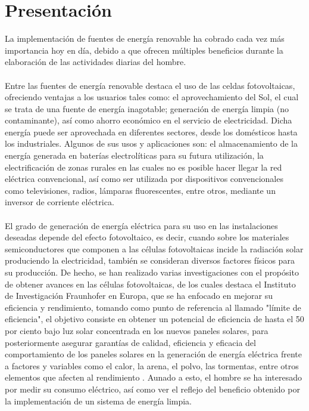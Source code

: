
\section{Presentación} %
La implementación de fuentes de energía renovable ha cobrado cada vez más importancia hoy en día, debido a que ofrecen múltiples beneficios durante la elaboración de las actividades diarias del hombre. 
\paragraph{}
Entre las fuentes de energía renovable destaca el uso de las celdas fotovoltaicas, ofreciendo ventajas a los usuarios tales como: el aprovechamiento del Sol, el cual se trata de una fuente de energía inagotable; generación de energía limpia (no contaminante), así como ahorro económico en el servicio de electricidad. Dicha energía puede ser aprovechada en diferentes sectores, desde los domésticos hasta los industriales. Algunos de sus usos y aplicaciones son: el almacenamiento de la energía generada en baterías electrolíticas para su futura utilización, la electrificación de zonas rurales en las cuales no es posible hacer llegar la red eléctrica convencional, así como ser utilizada por dispositivos convencionales como televisiones, radios, lámparas fluorescentes, entre otros, mediante un inversor de corriente eléctrica.\citep{Pre1}   
\paragraph{}
El grado de generación de energía eléctrica para su uso en las instalaciones deseadas depende del efecto fotovoltaico, es decir, cuando sobre los materiales semiconductores que componen a las células fotovoltaicas incide la radiación solar produciendo la electricidad, también se consideran diversos factores físicos para su producción. De hecho, se han realizado varias investigaciones con el propósito de obtener avances en las células fotovoltaicas, de los cuales destaca el Instituto de Investigación Fraunhofer en Europa, que se ha enfocado en mejorar su eficiencia y rendimiento, tomando como punto de referencia al llamado "límite de eficiencia", el objetivo consiste en obtener un potencial de eficiencia de hasta el 50 por ciento bajo luz solar concentrada en los nuevos paneles solares, para posteriormente asegurar garantías de calidad, eficiencia y eficacia del comportamiento de los paneles solares en la generación de energía eléctrica frente a factores y variables como el calor, la arena, el polvo, las tormentas, entre otros elementos que afecten al rendimiento \citep{Pre1}. Aunado a esto, el hombre se ha interesado por medir su consumo eléctrico, así como ver el reflejo del beneficio obtenido por la implementación de un sistema de energía limpia. 

